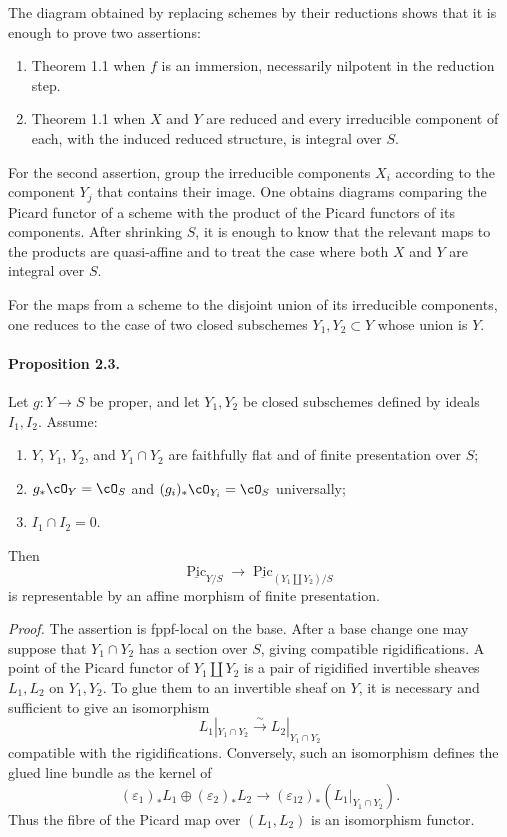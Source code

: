 \documentclass[11pt]{article}
\theoremstyle{plain}
\theoremstyle{definition}
\theoremstyle{remark}
\DeclareMathOperator{\Pic}{Pic}
\newcommand{\longto}{\longrightarrow}
\providecommand{\iso}{\xrightarrow{\sim}}
\begin{document}
The diagram obtained by replacing schemes by their reductions shows that it is enough to prove two assertions:

\begin{enumerate}[label=\Roman*.]
\item Theorem 1.1 when $f$ is an immersion, necessarily nilpotent in the reduction step.
\item Theorem 1.1 when $X$ and $Y$ are reduced and every irreducible component of each, with the induced reduced structure, is integral over $S$.
\end{enumerate}

For the second assertion, group the irreducible components $X_i$ according to the component $Y_j$ that contains their image. One obtains diagrams comparing the Picard functor of a scheme with the product of the Picard functors of its components. After shrinking $S$, it is enough to know that the relevant maps to the products are quasi-affine and to treat the case where both $X$ and $Y$ are integral over $S$.

For the maps from a scheme to the disjoint union of its irreducible components, one reduces to the case of two closed subschemes $Y_1,Y_2\subset Y$ whose union is $Y$.

\paragraph{Proposition 2.3.}
Let $g:Y\to S$ be proper, and let $Y_1,Y_2$ be closed subschemes defined by ideals $I_1,I_2$. Assume:
\begin{enumerate}[label=\alph*)]
\item $Y$, $Y_1$, $Y_2$, and $Y_1\cap Y_2$ are faithfully flat and of finite presentation over $S$;
\item $g_*\cO_Y=\cO_S$ and $(g_i)_*\cO_{Y_i}=\cO_S$ universally;
\item $I_1\cap I_2=0$.
\end{enumerate}
Then
\[
\underline{\Pic}_{Y/S}\longto
\underline{\Pic}_{(Y_1\amalg Y_2)/S}
\]
is representable by an affine morphism of finite presentation.

\emph{Proof.}
The assertion is fppf-local on the base. After a base change one may suppose that $Y_1\cap Y_2$ has a section over $S$, giving compatible rigidifications. A point of the Picard functor of $Y_1\amalg Y_2$ is a pair of rigidified invertible sheaves $L_1,L_2$ on $Y_1,Y_2$. To glue them to an invertible sheaf on $Y$, it is necessary and sufficient to give an isomorphism
\[
L_1|_{Y_1\cap Y_2}\iso L_2|_{Y_1\cap Y_2}
\]
compatible with the rigidifications. Conversely, such an isomorphism defines the glued line bundle as the kernel of
\[
(\varepsilon_1)_*L_1\oplus(\varepsilon_2)_*L_2
\longto
(\varepsilon_{12})_*(L_1|_{Y_1\cap Y_2}).
\]
Thus the fibre of the Picard map over $(L_1,L_2)$ is an isomorphism functor.
\end{document}

